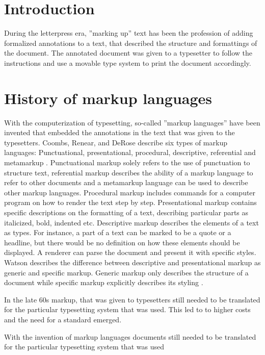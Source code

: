 \section{Introduction}

During the letterpress era, ''marking up'' text has been the profession of adding formalized annotations to a text, that described the structure and formattings of the document. The annotated document was given to a typesetter to follow the instructions and use a movable type system to print the document accordingly.

\section{History of markup languages}

With the computerization of typesetting, so-called ''markup languages'' have been invented that embedded the annotations in the text that was given to the typesetters. Coombs, Renear, and DeRose describe six types of markup languages: Punctuational, presentational, procedural, descriptive, referential and metamarkup \cite{Coombs:1987:MSF:32206.32209}. Punctuational markup solely refers to the use of punctuation to structure text, referential markup describes the ability of a markup language to refer to other documents and a metamarkup language can be used to describe other markup languages. Procedural markup includes commands for a computer program on how to render the text step by step. Presentational markup contains specific descriptions on the formatting of a text, describing particular parts as italicized, bold, indented etc. Descriptive markup describes the elements of a text as types. For instance, a part of a text can be marked to be a quote or a headline, but there would be no definition on how these elements should be displayed. A renderer can parse the document and present it with specific styles. Watson describes the difference between descriptive and presentational markup as generic and specific markup. Generic markup only describes the structure of a document while specific markup explicitly describes its styling \cite{watsonhistory}.

In the late 60s markup, that was given to typesetters still needed to be translated for the particular typesetting system that was used. This led to to higher costs and the need for a standard emerged.

With the invention of markup languages documents still needed to be translated for the particular typesetting system that was used

